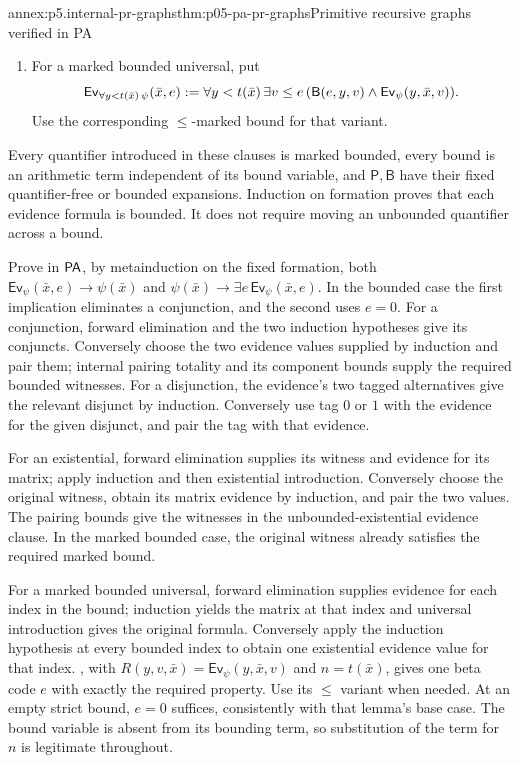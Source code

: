 \begin{annexitem}{annex:p5.internal-pr-graphs}{thm:p05-pa-pr-graphs}{Primitive recursive graphs verified in PA}
\begin{enumerate}
bound by \(y<t(\bar x)\).  For a \(\leq\)-marked existential use
that marked bound instead.  Pairing itself supplies \(y\leq e\)
whenever the displayed matrix holds.
\item For a marked bounded universal, put
\[
 \mathsf{Ev}_{\forall y<t(\bar x)\,\psi}(\bar x,e)\mathrel{:=}
 \forall y<t(\bar x)\,\exists v\leq e\,
   (\mathsf B(e,y,v)\land\mathsf{Ev}_\psi(y,\bar x,v)).
\]
Use the corresponding \(\leq\)-marked bound for that variant.
\end{enumerate}
Every quantifier introduced in these clauses is marked bounded, every bound
is an arithmetic term independent of its bound variable, and
\(\mathsf P,\mathsf B\) have their fixed quantifier-free or bounded
expansions.  Induction on formation proves that each evidence formula is
bounded.  It does not require moving an unbounded quantifier across a bound.

Prove in \(\mathsf{PA}\), by metainduction on the fixed formation, both
\(\mathsf{Ev}_\psi(\bar x,e)\to\psi(\bar x)\) and
\(\psi(\bar x)\to\exists e\,\mathsf{Ev}_\psi(\bar x,e)\).
In the bounded case the first implication eliminates a conjunction, and
the second uses \(e=0\).  For a conjunction, forward elimination and
the two induction hypotheses give its conjuncts.  Conversely choose the
two evidence values supplied by induction and pair them; internal pairing
totality and its component bounds supply the required bounded witnesses.
For a disjunction, the evidence's two tagged alternatives give the relevant
disjunct by induction.  Conversely use tag \(0\) or \(1\) with the
evidence for the given disjunct, and pair the tag with that evidence.

For an existential, forward elimination supplies its witness and evidence
for its matrix; apply induction and then existential introduction.
Conversely choose the original witness, obtain its matrix evidence by
induction, and pair the two values.  The pairing bounds give the witnesses
in the unbounded-existential evidence clause.  In the marked bounded case,
the original witness already satisfies the required marked bound.

For a marked bounded universal, forward elimination supplies evidence for
each index in the bound; induction yields the matrix at that index and
universal introduction gives the original formula.  Conversely apply the
induction hypothesis at every bounded index to obtain one existential
evidence value for that index.  , with
\(R(y,v,\bar x)=\mathsf{Ev}_\psi(y,\bar x,v)\) and
\(n=t(\bar x)\), gives one beta code \(e\) with exactly the required
property.  Use its \(\leq\) variant when needed.  At an empty strict
bound, \(e=0\) suffices, consistently with that lemma's base case.
The bound variable is absent from its bounding term, so substitution of
the term for \(n\) is legitimate throughout.


\end{annexitem}

